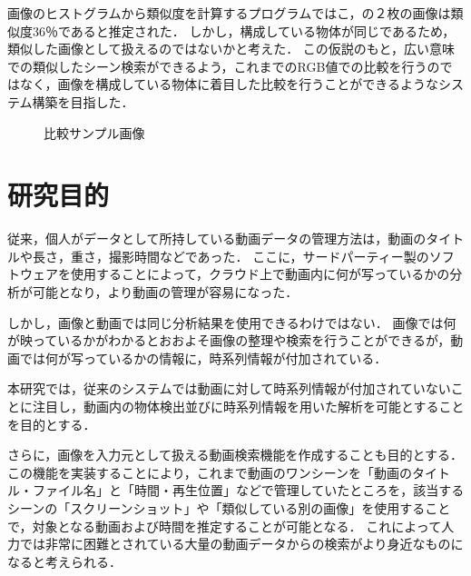 \documentclass[a4j,12pt,dvipdfmx]{jreport}
\begin{document}
画像のヒストグラムから類似度を計算するプログラムではこ，の２枚の画像は類似度36％であると推定された．
しかし，構成している物体が同じであるため，類似した画像として扱えるのではないかと考えた．
この仮説のもと，広い意味での類似したシーン検索ができるよう，これまでのRGB値での比較を行うのではなく，画像を構成している物体に着目した比較を行うことができるようなシステム構築を目指した．

\vspace{2zh}
\begin{figure}[htbp]
  \centering
  \caption{\label{fig:hikaku} 比較サンプル画像}
\end{figure}

\clearpage
\section{研究目的}
従来，個人がデータとして所持している動画データの管理方法は，動画のタイトルや長さ，重さ，撮影時間などであった．
ここに，サードパーティー製のソフトウェアを使用することによって，クラウド上で動画内に何が写っているかの分析が可能となり，より動画の管理が容易になった．

しかし，画像と動画では同じ分析結果を使用できるわけではない．
画像では何が映っているかがわかるとおおよそ画像の整理や検索を行うことができるが，動画では何が写っているかの情報に，時系列情報が付加されている．

本研究では，従来のシステムでは動画に対して時系列情報が付加されていないことに注目し，動画内の物体検出並びに時系列情報を用いた解析を可能とすることを目的とする．

さらに，画像を入力元として扱える動画検索機能を作成することも目的とする．
この機能を実装することにより，これまで動画のワンシーンを「動画のタイトル・ファイル名」と「時間・再生位置」などで管理していたところを，該当するシーンの「スクリーンショット」や「類似している別の画像」を使用することで，対象となる動画および時間を推定することが可能となる．
これによって人力では非常に困難とされている大量の動画データからの検索がより身近なものになると考えられる．
\end{document}
